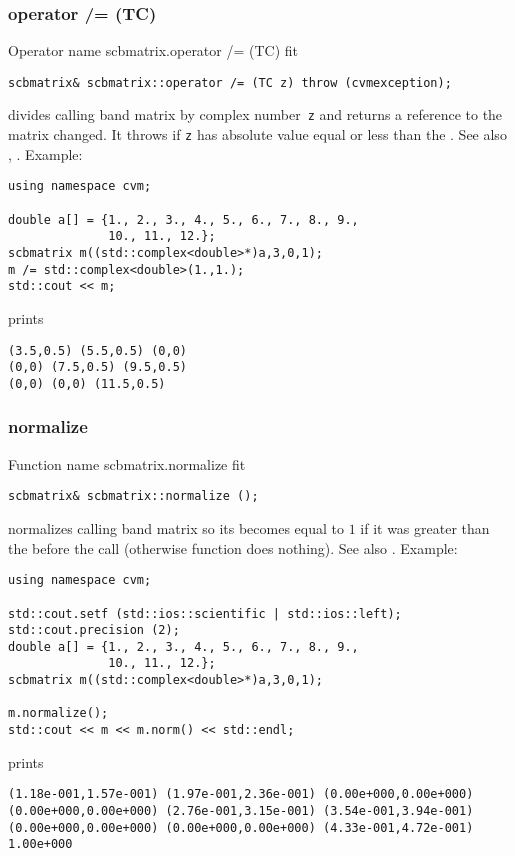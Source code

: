 \subsubsection{operator /= (TC)}
Operator%
\pdfdest name {scbmatrix.operator /= (TC)} fit
\begin{verbatim}
scbmatrix& scbmatrix::operator /= (TC z) throw (cvmexception);
\end{verbatim}
divides  calling band matrix by  complex number~\verb"z"
and returns a reference to
the matrix changed.
It throws  
if \verb"z" has  absolute value equal or less
than the 
.
See also ,
.
Example:
\begin{Verbatim}
using namespace cvm;

double a[] = {1., 2., 3., 4., 5., 6., 7., 8., 9.,
              10., 11., 12.};
scbmatrix m((std::complex<double>*)a,3,0,1);
m /= std::complex<double>(1.,1.);
std::cout << m;
\end{Verbatim}
prints
\begin{Verbatim}
(3.5,0.5) (5.5,0.5) (0,0)
(0,0) (7.5,0.5) (9.5,0.5)
(0,0) (0,0) (11.5,0.5)
\end{Verbatim}
\newpage



\subsubsection{normalize}
Function%
\pdfdest name {scbmatrix.normalize} fit
\begin{verbatim}
scbmatrix& scbmatrix::normalize ();
\end{verbatim}
normalizes  calling band matrix so its 
becomes equal to $1$ if it was greater than the 
before the call (otherwise function does nothing).
See also .
Example:
\begin{Verbatim}
using namespace cvm;

std::cout.setf (std::ios::scientific | std::ios::left); 
std::cout.precision (2);
double a[] = {1., 2., 3., 4., 5., 6., 7., 8., 9.,
              10., 11., 12.};
scbmatrix m((std::complex<double>*)a,3,0,1);

m.normalize();
std::cout << m << m.norm() << std::endl;
\end{Verbatim}
prints
\begin{Verbatim}
(1.18e-001,1.57e-001) (1.97e-001,2.36e-001) (0.00e+000,0.00e+000)
(0.00e+000,0.00e+000) (2.76e-001,3.15e-001) (3.54e-001,3.94e-001)
(0.00e+000,0.00e+000) (0.00e+000,0.00e+000) (4.33e-001,4.72e-001)
1.00e+000
\end{Verbatim}
\newpage



